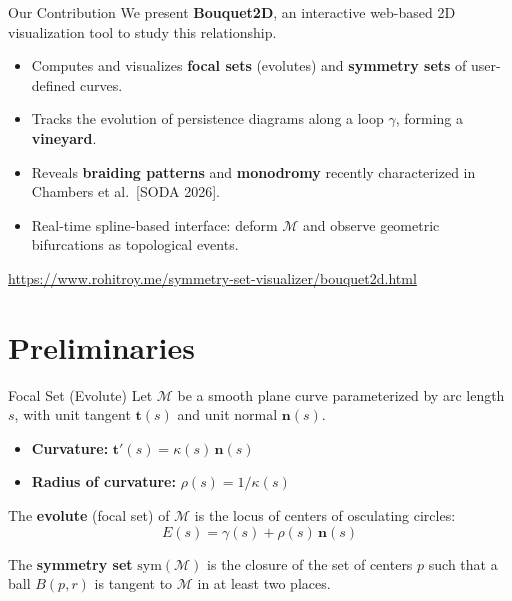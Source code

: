 \documentclass[
	11pt, %
]{beamer}
\newcommand{\M}{\mathcal{M}}
\begin{document}
\begin{frame}{Our Contribution}
    We present \textbf{Bouquet2D}, an interactive web-based 2D visualization tool to study this relationship.

    \bigskip

    \begin{itemize}
        \item Computes and visualizes \textbf{focal sets} (evolutes) and \textbf{symmetry sets} of user-defined curves.
        \pause
        \item Tracks the evolution of persistence diagrams along a loop $\gamma$, forming a \textbf{vineyard}.
        \pause
        \item Reveals \textbf{braiding patterns} and \textbf{monodromy} recently characterized in Chambers et al.\ [SODA 2026].
        \pause
        \item Real-time spline-based interface: deform $\M$ and observe geometric bifurcations as topological events.
    \end{itemize}

    \bigskip
    \centering
    \url{https://www.rohitroy.me/symmetry-set-visualizer/bouquet2d.html}
\end{frame}


\section{Preliminaries}

\begin{frame}{Focal Set (Evolute)}
    Let $\M$ be a smooth plane curve parameterized by arc length $s$, with unit tangent $\mathbf{t}(s)$ and unit normal $\mathbf{n}(s)$.

    \begin{itemize}
        \item \textbf{Curvature:} $\mathbf{t}'(s) = \kappa(s)\,\mathbf{n}(s)$
        \item \textbf{Radius of curvature:} $\rho(s) = 1/\kappa(s)$
    \end{itemize}

    \begin{definition}[Evolute]
    The \textbf{evolute} (focal set) of $\M$ is the locus of centers of osculating circles:
    \[
    E(s) = \gamma(s) + \rho(s)\,\mathbf{n}(s)
    \]
    \end{definition}

    \pause
    \begin{definition}
    The \textbf{symmetry set} $\mathrm{sym}(\M)$ is the closure of the set of centers $p$ such that a ball $B(p,r)$ is tangent to $\M$ in at least two places.
    \end{definition}
\end{frame}
\end{document}
